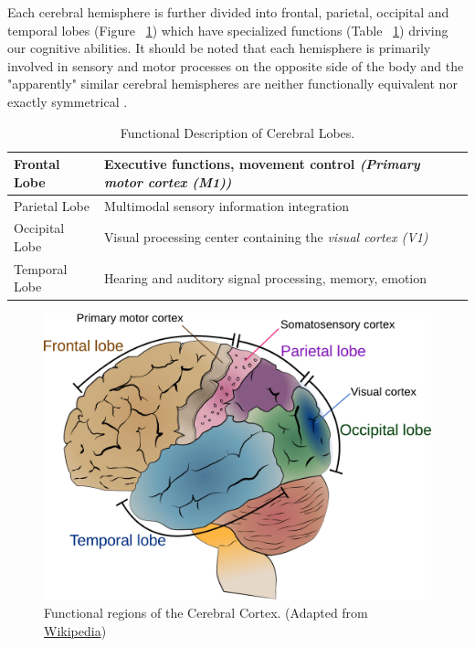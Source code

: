 \documentclass[12pt]{article}
\numberwithin{equation}{section}
\numberwithin{figure}{section}
\numberwithin{table}{section}
\begin{document}
\par{
    Each cerebral hemisphere is further divided
    into frontal, parietal, occipital and temporal lobes (Figure ~\ref{fig:brain_parts})
    which have specialized functions (Table ~\ref{table:brain_functions}) driving our cognitive abilities.
    It should be noted that each hemisphere is primarily involved in sensory and motor processes on
    the opposite side of the body and the "apparently" similar cerebral hemispheres are
    neither functionally equivalent nor exactly symmetrical \citep{kandel_principles_2013}.

\begin{table}[H]
    \footnotesize
    \centering
    \caption{Functional Description of Cerebral Lobes.}
    \begin{tabular}{l l}
        \hline
        Frontal Lobe & Executive functions, movement control \emph{(Primary motor cortex (M1))}\\ \hline
        Parietal Lobe & Multimodal sensory information integration \\ \hline
        Occipital Lobe & Visual processing center containing the \emph{visual cortex (V1)} \\ \hline
        Temporal Lobe & Hearing and auditory signal processing, memory, emotion\\ \hline
    \end{tabular}
    \label{table:brain_functions}
\end{table}

\begin{figure}[ht]
    \centering
    \includegraphics[scale=0.5]{images/Cerebrum_lobes}
    \caption[Functional Regions of the Cerebral Cortex.]{Functional regions of the Cerebral Cortex. (Adapted from \href{http://en.wikipedia.org/wiki/File:Cerebrum_lobes.svg}{Wikipedia})}
    \label{fig:brain_parts}
\end{figure}
}
\end{document}
